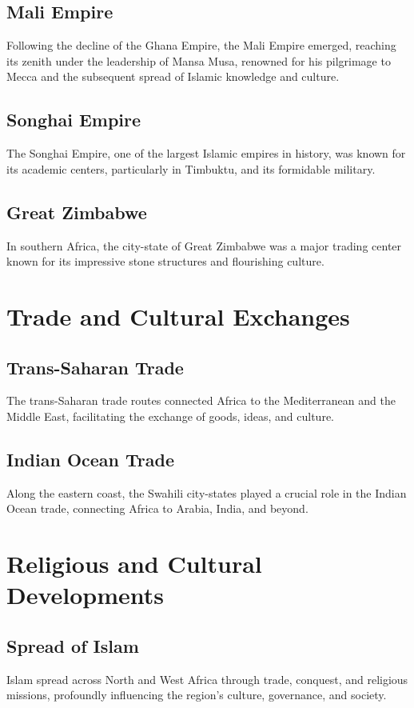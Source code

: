 \documentclass[a4paper,12pt]{book}
\begin{document}
\subsection{Mali Empire}
Following the decline of the Ghana Empire, the Mali Empire emerged, reaching its zenith under the leadership of Mansa Musa, renowned for his pilgrimage to Mecca and the subsequent spread of Islamic knowledge and culture.

\subsection{Songhai Empire}
The Songhai Empire, one of the largest Islamic empires in history, was known for its academic centers, particularly in Timbuktu, and its formidable military.

\subsection{Great Zimbabwe}
In southern Africa, the city-state of Great Zimbabwe was a major trading center known for its impressive stone structures and flourishing culture.

\section{Trade and Cultural Exchanges}
\label{sec:trade-cultural-exchanges}

\subsection{Trans-Saharan Trade}
The trans-Saharan trade routes connected Africa to the Mediterranean and the Middle East, facilitating the exchange of goods, ideas, and culture.

\subsection{Indian Ocean Trade}
Along the eastern coast, the Swahili city-states played a crucial role in the Indian Ocean trade, connecting Africa to Arabia, India, and beyond.

\section{Religious and Cultural Developments}
\label{sec:religious-cultural-developments}

\subsection{Spread of Islam}
Islam spread across North and West Africa through trade, conquest, and religious missions, profoundly influencing the region’s culture, governance, and society.
\end{document}
